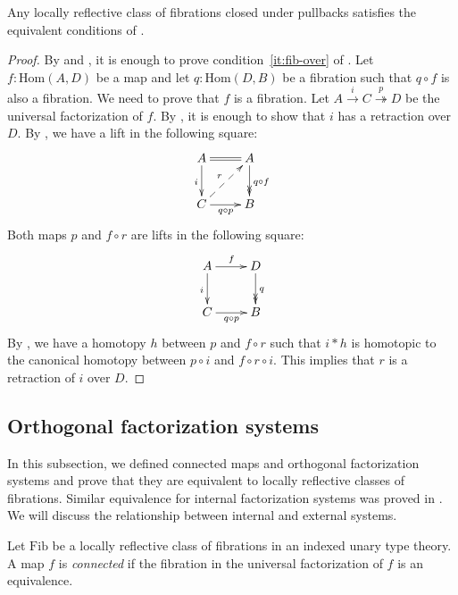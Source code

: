 \documentclass[reqno]{mscs}
\newcommand{\fs}[1]{\mathrm{#1}}
\newcommand{\Hom}{\fs{Hom}}
\newcommand{\Fib}{\fs{Fib}}
\numberwithin{figure}{section}
\begin{document}
\begin{prop}
Any locally reflective class of fibrations closed under pullbacks satisfies the equivalent conditions of .
\end{prop}
\begin{proof}
By  and , it is enough to prove condition~\eqref{it:fib-over} of .
Let $f : \Hom(A,D)$ be a map and let $q : \Hom(D,B)$ be a fibration such that $q \circ f$ is also a fibration.
We need to prove that $f$ is a fibration.
Let $A \xrightarrow{i} C \overset{p}\twoheadrightarrow D$ be the universal factorization of $f$.
By , it is enough to show that $i$ has a retraction over $D$.
By , we have a lift in the following square:
\[ \xymatrix{ A \ar@{=}[r] \ar[d]_i                 & A \ar@{->>}[d]^{q \circ f} \\
              C \ar[r]_{q \circ p} \ar@{-->}[ur]^r  & B
            } \]
Both maps $p$ and $f \circ r$ are lifts in the following square:
\[ \xymatrix{ A \ar[r]^f \ar[d]_i   & D \ar@{->>}[d]^q \\
              C \ar[r]_{q \circ p}  & B
            } \]
By , we have a homotopy $h$ between $p$ and $f \circ r$ such that $i * h$ is homotopic to the canonical homotopy between $p \circ i$ and $f \circ r \circ i$.
This implies that $r$ is a retraction of $i$ over $D$.
\end{proof}

\subsection{Orthogonal factorization systems}

In this subsection, we defined connected maps and orthogonal factorization systems and prove that they are equivalent to locally reflective classes of fibrations.
Similar equivalence for internal factorization systems was proved in \cite{modality-hott}.
We will discuss the relationship between internal and external systems.

\begin{defn}
Let $\Fib$ be a locally reflective class of fibrations in an indexed unary type theory.
A map $f$ is \emph{connected} if the fibration in the universal factorization of $f$ is an equivalence.
\end{defn}
\end{document}

